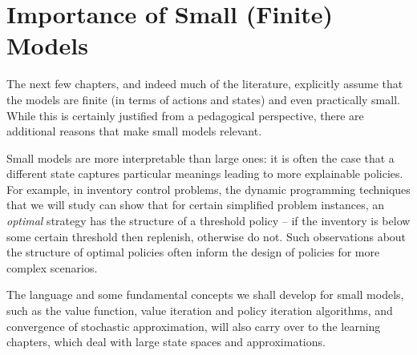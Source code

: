 

\section{Importance of Small (Finite) Models}

The next few chapters, and indeed much of the literature, explicitly assume that the models are finite (in terms of actions and states) and even practically small. While this is certainly justified from a pedagogical perspective, there are additional reasons that make small models relevant. 


Small models are more interpretable than large ones: it is often the case that a different state captures particular meanings leading to more explainable policies. For example, in inventory control problems, the dynamic programming techniques that we will study can show that for certain simplified problem instances, an \textit{optimal} strategy has the structure of a threshold policy -- if the inventory is below some certain threshold then replenish, otherwise do not. Such observations about the structure of optimal policies often inform the design of policies for more complex scenarios.

The language and some fundamental concepts we shall develop for small models, such as the value function, value iteration and policy iteration algorithms, and convergence of stochastic approximation, will also carry over to the learning chapters, which deal with large state spaces and approximations.

